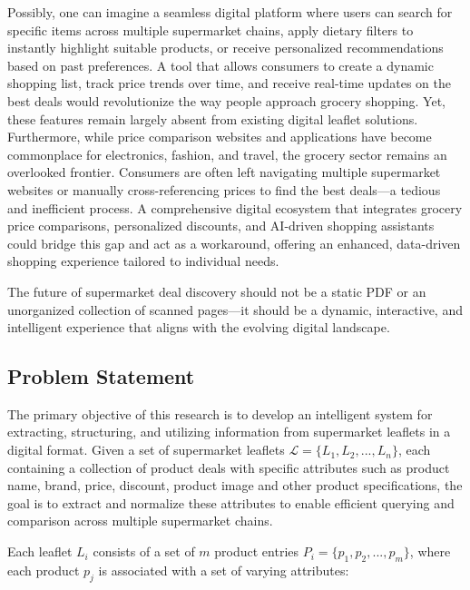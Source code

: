 \documentclass[11pt]{article}
\begin{document}
Possibly, one can imagine a seamless digital platform where users can search for specific items across multiple supermarket chains, apply dietary filters to instantly highlight suitable products, or receive personalized recommendations based on past preferences. A tool that allows consumers to create a dynamic shopping list, track price trends over time, and receive real-time updates on the best deals would revolutionize the way people approach grocery shopping. Yet, these features remain largely absent from existing digital leaflet solutions. Furthermore, while price comparison websites and applications have become commonplace for electronics, fashion, and travel, the grocery sector remains an overlooked frontier. Consumers are often left navigating multiple supermarket websites or manually cross-referencing prices to find the best deals—a tedious and inefficient process. A comprehensive digital ecosystem that integrates grocery price comparisons, personalized discounts, and AI-driven shopping assistants could bridge this gap and act as a workaround, offering an enhanced, data-driven shopping experience tailored to individual needs.

The future of supermarket deal discovery should not be a static PDF or an unorganized collection of scanned pages—it should be a dynamic, interactive, and intelligent experience that aligns with the evolving digital landscape.

\subsection{Problem Statement}
The primary objective of this research is to develop an intelligent system for extracting, structuring, and utilizing information from supermarket leaflets in a digital format. Given a set of supermarket leaflets \(\mathcal{L} = \{L_1, L_2, ..., L_n\}\), each containing a collection of product deals with specific attributes such as product name, brand, price, discount, product image and other product specifications, the goal is to extract and normalize these attributes to enable efficient querying and comparison across multiple supermarket chains.

Each leaflet \( L_i \) consists of a set of $m$ product entries \( P_i = \{p_1, p_2, ..., p_m\} \), where each product \( p_j \) is associated with a set of varying attributes: 
\end{document}
